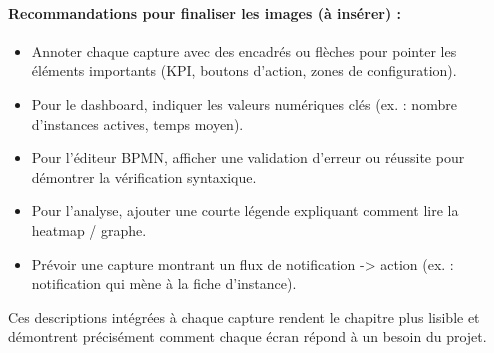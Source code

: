 \paragraph{Recommandations pour finaliser les images (à insérer) :}
\begin{itemize}
    \item Annoter chaque capture avec des encadrés ou flèches pour pointer les éléments importants (KPI, boutons d’action, zones de configuration).
    \item Pour le dashboard, indiquer les valeurs numériques clés (ex. : nombre d’instances actives, temps moyen).
    \item Pour l’éditeur BPMN, afficher une validation d’erreur ou réussite pour démontrer la vérification syntaxique.
    \item Pour l’analyse, ajouter une courte légende expliquant comment lire la heatmap / graphe.
    \item Prévoir une capture montrant un flux de notification -> action (ex. : notification qui mène à la fiche d’instance).
\end{itemize}

\bigskip
Ces descriptions intégrées à chaque capture rendent le chapitre plus lisible et démontrent précisément comment chaque écran répond à un besoin du projet.

